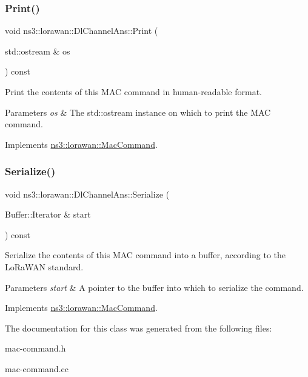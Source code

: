 \subsubsection{\texorpdfstring{Print()}{Print()}}
{\footnotesize\ttfamily void ns3\+::lorawan\+::\+Dl\+Channel\+Ans\+::\+Print (\begin{DoxyParamCaption}\item[{std\+::ostream \&}]{os }\end{DoxyParamCaption}) const\hspace{0.3cm}{\ttfamily [virtual]}}

Print the contents of this M\+AC command in human-\/readable format.


\begin{DoxyParams}{Parameters}
{\em os} & The std\+::ostream instance on which to print the M\+AC command. \\
\hline
\end{DoxyParams}


Implements \hyperlink{classns3_1_1lorawan_1_1MacCommand_a6bf88db38dab7dcd817811a9fb59f920}{ns3\+::lorawan\+::\+Mac\+Command}.

\mbox{\label{classns3_1_1lorawan_1_1DlChannelAns_a9fef6b765888e26a0031757b435028a0}} 
\subsubsection{\texorpdfstring{Serialize()}{Serialize()}}
{\footnotesize\ttfamily void ns3\+::lorawan\+::\+Dl\+Channel\+Ans\+::\+Serialize (\begin{DoxyParamCaption}\item[{Buffer\+::\+Iterator \&}]{start }\end{DoxyParamCaption}) const\hspace{0.3cm}{\ttfamily [virtual]}}

Serialize the contents of this M\+AC command into a buffer, according to the Lo\+Ra\+W\+AN standard.


\begin{DoxyParams}{Parameters}
{\em start} & A pointer to the buffer into which to serialize the command. \\
\hline
\end{DoxyParams}


Implements \hyperlink{classns3_1_1lorawan_1_1MacCommand_a0ed44b33942ddc3dc9694dc06ab0b87f}{ns3\+::lorawan\+::\+Mac\+Command}.



The documentation for this class was generated from the following files\+:\begin{DoxyCompactItemize}
\item 
mac-\/command.\+h\item 
mac-\/command.\+cc\end{DoxyCompactItemize}
